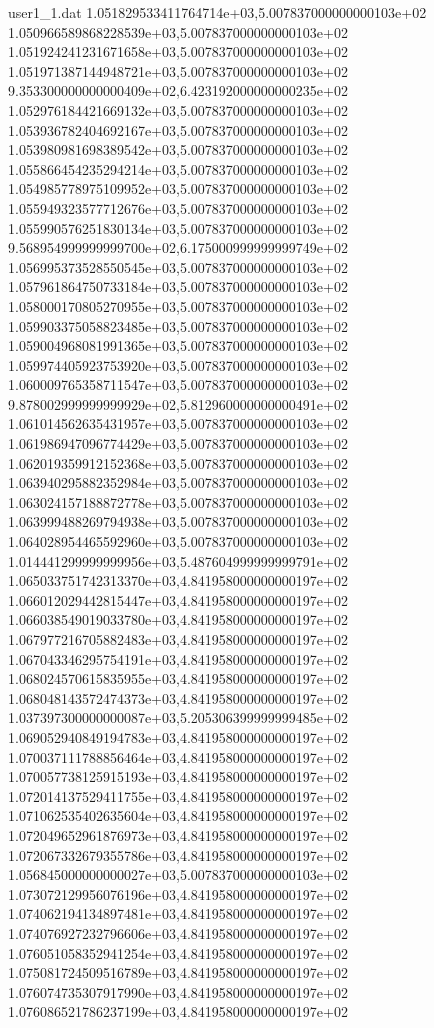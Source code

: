 \begin{filecontents}{user1_1.dat}
1.051829533411764714e+03,5.007837000000000103e+02
1.050966589868228539e+03,5.007837000000000103e+02
1.051924241231671658e+03,5.007837000000000103e+02
1.051971387144948721e+03,5.007837000000000103e+02
9.353300000000000409e+02,6.423192000000000235e+02
1.052976184421669132e+03,5.007837000000000103e+02
1.053936782404692167e+03,5.007837000000000103e+02
1.053980981698389542e+03,5.007837000000000103e+02
1.055866454235294214e+03,5.007837000000000103e+02
1.054985778975109952e+03,5.007837000000000103e+02
1.055949323577712676e+03,5.007837000000000103e+02
1.055990576251830134e+03,5.007837000000000103e+02
9.568954999999999700e+02,6.175000999999999749e+02
1.056995373528550545e+03,5.007837000000000103e+02
1.057961864750733184e+03,5.007837000000000103e+02
1.058000170805270955e+03,5.007837000000000103e+02
1.059903375058823485e+03,5.007837000000000103e+02
1.059004968081991365e+03,5.007837000000000103e+02
1.059974405923753920e+03,5.007837000000000103e+02
1.060009765358711547e+03,5.007837000000000103e+02
9.878002999999999929e+02,5.812960000000000491e+02
1.061014562635431957e+03,5.007837000000000103e+02
1.061986947096774429e+03,5.007837000000000103e+02
1.062019359912152368e+03,5.007837000000000103e+02
1.063940295882352984e+03,5.007837000000000103e+02
1.063024157188872778e+03,5.007837000000000103e+02
1.063999488269794938e+03,5.007837000000000103e+02
1.064028954465592960e+03,5.007837000000000103e+02
1.014441299999999956e+03,5.487604999999999791e+02
1.065033751742313370e+03,4.841958000000000197e+02
1.066012029442815447e+03,4.841958000000000197e+02
1.066038549019033780e+03,4.841958000000000197e+02
1.067977216705882483e+03,4.841958000000000197e+02
1.067043346295754191e+03,4.841958000000000197e+02
1.068024570615835955e+03,4.841958000000000197e+02
1.068048143572474373e+03,4.841958000000000197e+02
1.037397300000000087e+03,5.205306399999999485e+02
1.069052940849194783e+03,4.841958000000000197e+02
1.070037111788856464e+03,4.841958000000000197e+02
1.070057738125915193e+03,4.841958000000000197e+02
1.072014137529411755e+03,4.841958000000000197e+02
1.071062535402635604e+03,4.841958000000000197e+02
1.072049652961876973e+03,4.841958000000000197e+02
1.072067332679355786e+03,4.841958000000000197e+02
1.056845000000000027e+03,5.007837000000000103e+02
1.073072129956076196e+03,4.841958000000000197e+02
1.074062194134897481e+03,4.841958000000000197e+02
1.074076927232796606e+03,4.841958000000000197e+02
1.076051058352941254e+03,4.841958000000000197e+02
1.075081724509516789e+03,4.841958000000000197e+02
1.076074735307917990e+03,4.841958000000000197e+02
1.076086521786237199e+03,4.841958000000000197e+02

\end{filecontents}

